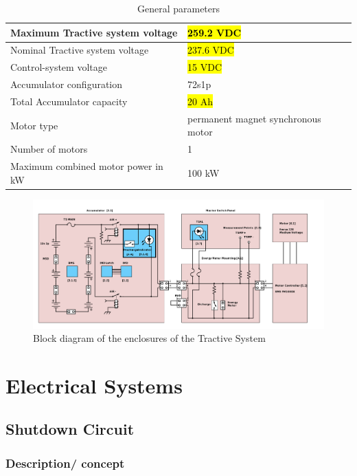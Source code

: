 \documentclass{article}
\begin{document}
	\begin{table}[H]
        \centering
        \begin{tabular}{|l|l|}
        \hline
            Maximum Tractive system voltage & \hl{259.2 VDC} \\ \hline
            Nominal Tractive system voltage & \hl{237.6 VDC} \\ \hline
            Control-system voltage & \hl{15 VDC} \\ \hline
            Accumulator configuration & 72s1p \\ \hline
            Total Accumulator capacity & \hl{20 Ah} \\ \hline
            Motor type & permanent magnet synchronous motor \\ \hline
            Number of motors & 1 \\ \hline
            Maximum combined motor power in kW & 100 kW \\ \hline
        \end{tabular}
        \caption{General parameters}
        \label{systemtable}
  \end{table}

  \begin{figure}[H]
  \centering
  \includegraphics[width = 0.9 \textwidth]{TS-Block-Diagram.png}
  \caption{Block diagram of the enclosures of the Tractive System}
  \label{fig:TS_block_diagram}
  \end{figure}


\section{Electrical Systems}\label{electrical_systems}

\subsection{Shutdown Circuit}\label{shutdown_circuit}

\subsubsection{Description/ concept}
\end{document}
